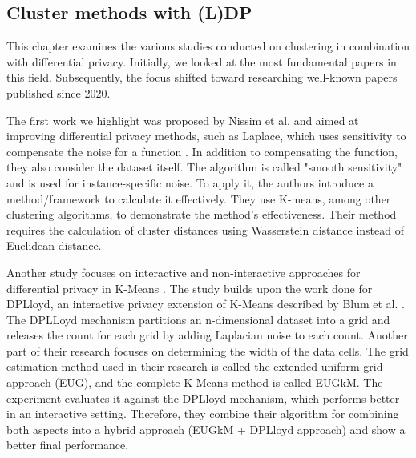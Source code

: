 \subsection{Cluster methods with (L)DP}
This chapter examines the various studies conducted on clustering in combination with differential privacy.
Initially, we looked at the most fundamental papers in this field. Subsequently, the focus shifted toward researching well-known papers published since 2020.

The first work we highlight was proposed by Nissim et al. and aimed at improving differential privacy methods, such as Laplace, which uses sensitivity to compensate the noise for a function \citep{nissim_smooth_2007}.
In addition to compensating the function, they also consider the dataset itself.
The algorithm is called "smooth sensitivity" and is used for instance-specific noise.
To apply it, the authors introduce a method/framework to calculate it effectively.
They use K-means, among other clustering algorithms, to demonstrate the method's effectiveness.
Their method requires the calculation of cluster distances using Wasserstein distance instead of Euclidean distance.

Another study focuses on interactive and non-interactive approaches for differential privacy in K-Means \citep{su_differentially_2015}.
The study builds upon the work done for DPLloyd, an interactive privacy extension of K-Means described by Blum et al. \citep{blum_practical_2005}.
The DPLLoyd mechanism partitions an n-dimensional dataset into a grid and releases the count for each grid by adding Laplacian noise to each count.
Another part of their research focuses on determining the width of the data cells.
The grid estimation method used in their research is called the extended uniform grid approach (EUG), and the complete K-Means method is called EUGkM.
The experiment evaluates it against the DPLloyd mechanism, which performs better in an interactive setting.
Therefore, they combine their algorithm for combining both aspects into a hybrid approach (EUGkM + DPLloyd approach) and show a better final performance.

